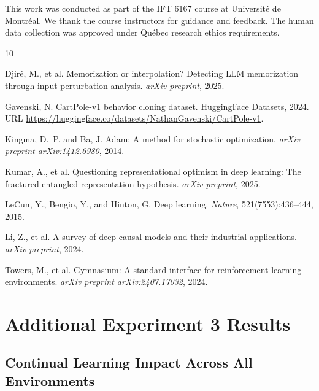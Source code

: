\documentclass{article}
\begin{document}
This work was conducted as part of the IFT 6167 course at Universit\'{e} de Montr\'{e}al. We thank the course instructors for guidance and feedback. The human data collection was approved under Qu\'{e}bec research ethics requirements.


\begin{thebibliography}{10}

Djir\'{e}, M., et al.
\newblock Memorization or interpolation? Detecting LLM memorization through input perturbation analysis.
\newblock \emph{arXiv preprint}, 2025.

Gavenski, N.
\newblock CartPole-v1 behavior cloning dataset.
\newblock HuggingFace Datasets, 2024.
\newblock URL \url{https://huggingface.co/datasets/NathanGavenski/CartPole-v1}.

Kingma, D.~P. and Ba, J.
\newblock Adam: A method for stochastic optimization.
\newblock \emph{arXiv preprint arXiv:1412.6980}, 2014.

Kumar, A., et al.
\newblock Questioning representational optimism in deep learning: The fractured entangled representation hypothesis.
\newblock \emph{arXiv preprint}, 2025.

LeCun, Y., Bengio, Y., and Hinton, G.
\newblock Deep learning.
\newblock \emph{Nature}, 521(7553):436--444, 2015.

Li, Z., et al.
\newblock A survey of deep causal models and their industrial applications.
\newblock \emph{arXiv preprint}, 2024.

Towers, M., et al.
\newblock Gymnasium: A standard interface for reinforcement learning environments.
\newblock \emph{arXiv preprint arXiv:2407.17032}, 2024.

\end{thebibliography}

\newpage
\appendix

\section{Additional Experiment 3 Results}

\subsection{Continual Learning Impact Across All Environments}
\end{document}
